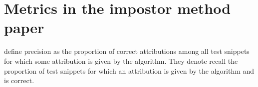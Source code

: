 \section{Metrics in the impostor method paper}
\label{sec:impostor_metrics}

\citet{koppel_determining_2014} define precision as the proportion of correct attributions among all test snippets 
for which some attribution is given by the algorithm.
They denote recall the proportion of test snippets for which an attribution is given by the algorithm and is correct.